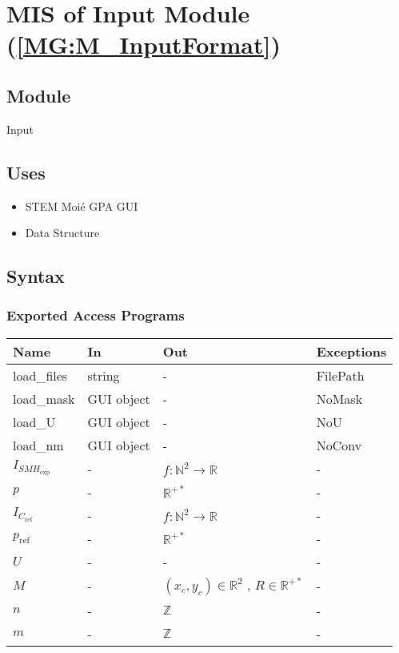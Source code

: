 \documentclass[12pt, titlepage]{article}
\begin{document}
\section{MIS of Input Module (\texorpdfstring{\cref{MG:M_InputFormat}}))} \label{MIS_Input}

\subsection{Module}
Input
\subsection{Uses}
\begin{itemize}
\item STEM Moi{\'e} GPA GUI
\item Data Structure
\end{itemize}

\subsection{Syntax}

\subsubsection{Exported Access Programs}

\begin{center}
\begin{tabular}{p{4cm} p{4cm} p{4cm} p{2cm}}
\hline
\textbf{Name} & \textbf{In} & \textbf{Out} & \textbf{Exceptions} \\
\hline
load{\_}files & string & - & FilePath \\
load{\_}mask & GUI object & - & NoMask \\
load{\_}U & GUI object & - & NoU \\
load{\_}nm & GUI object & - & NoConv \\
$I_{\mathit{SMH}_{\text{exp}}}$ & - & $f:\mathbb{N}^2\rightarrow\mathbb{R}$ & - \\
$p$ & - & $\mathbb{R}^{+*}$ & - \\
$I_{C_{\text{ref}}}$ & - & $f:\mathbb{N}^2\rightarrow\mathbb{R}$ & - \\
$p_{\text{ref}}$ & - & $\mathbb{R}^{+*}$ & - \\
$U$ & - & - & - \\
$M$ & - & $(x_c,y_c) \in \mathbb{R}^2$ , $R \in \mathbb{R}^{+*}$ & - \\
$n$ & - & $\mathbb{Z}$ & - \\
$m$ & - & $\mathbb{Z}$ & - \\

\hline
\end{tabular}
\end{center}
\end{document}
